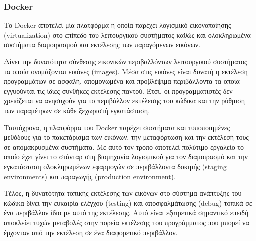 \subsubsection{Docker} \label{subsection:4-3-1-2-docker}


Το Docker αποτελεί μία πλατφόρμα η οποία παρέχει λογισμικό εικονοποίησης (virtualization) στο επίπεδο του λειτουργικού συστήματος καθώς και ολοκληρωμένα συστήματα διαμοιρασμού και εκτέλεσης των παραγόμενων εικόνων.

Δίνει την δυνατότητα σύνθεσης εικονικών περιβαλλόντων λειτουργικού συστήματος τα οποία ονομάζονται εικόνες (images). Μέσα στις εικόνες είναι δυνατή η εκτέλεση προγραμμάτων σε ασφαλή, απομονωμένα και προβλέψιμα περιβάλλοντα τα οποία εγγυούνται τις ίδιες συνθήκες εκτέλεσης παντού. Έτσι, οι προγραμματιστές δεν χρειάζεται να ανησυχούν για το περιβάλλον εκτέλεσης του κώδικα και την ρύθμιση των παραμέτρων σε κάθε ξεχωριστή εγκατάσταση.

Ταυτόχρονα, η πλατφόρμα του Docker παρέχει συστήματα και τυποποιημένες μεθόδους για το πακετάρισμα των εικόνων, την μεταφόρτωση και την εκτέλεσή τους σε απομακρυσμένα συστήματα. Με αυτό τον τρόπο αποτελεί πολύτιμο εργαλείο το οποίο έχει γίνει το στάνταρ στη βιομηχανία λογισμικού για τον διαμοιρασμό και την εγκατάσταση ολοκληρωμένων εφαρμογών σε περιβάλλοντα δοκιμής (staging environments) και παραγωγής (production environment).

Τέλος, η δυνατότητα τοπικής εκτέλεσης των εικόνων στο σύστημα ανάπτυξης του κώδικα δίνει την ευκαιρία ελέγχου (testing) και αποσφαλμάτωσης (debug) τοπικά σε ένα περιβάλλον ίδιο με αυτό της εκτέλεσης. Αυτό είναι εξαιρετικά σημαντικό επειδή αποκλείει τυχών μεταβολές στην πορεία εκτέλεσης του προγράμματος που μπορεί να έρχονταν από την εκτέλεση σε ένα διαφορετικό περιβάλλον.

